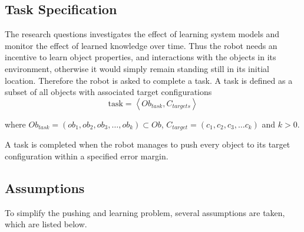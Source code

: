 \subsection{Task Specification}%
\label{subsec:task}
The research questions investigates the effect of learning system models and monitor the effect of learned knowledge over time. Thus the robot needs an incentive to learn object properties, and interactions with the objects in its environment, otherwise it would simply remain standing still in its initial location. Therefore the robot is asked to complete a task. A task is defined as a subset of all objects with associated target configurations\bs
\[\text{task} = \left\langle Ob_{task}, C_{targets} \right\rangle\]


where $Ob_{task} = (ob_1, ob_2, ob_3, \dots, ob_k) \subset Ob$, $C_{target} = (c_1, c_2, c_3, \dots c_k)$ and $k>0$.\bs

A task is completed when the robot manages to push every object to its target configuration within a specified error margin.

\subsection{Assumptions}%
\label{subsec:assumptions}
To simplify the pushing and learning problem, several assumptions are taken, which are listed below.\bs

